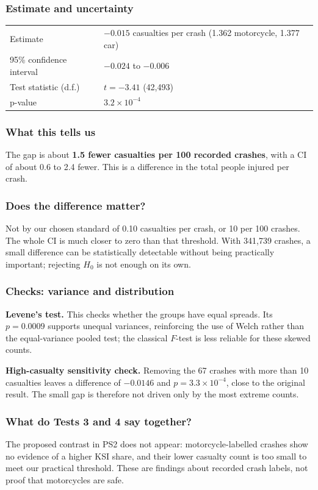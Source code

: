 \documentclass[10pt,a4paper,twocolumn]{article}
\begin{document}
\subsubsection*{Estimate and uncertainty}
{\small
\begin{tabularx}{\linewidth}{@{}K{3.4cm} Y@{}}
\toprule
Estimate & $-0.015$ casualties per crash (1.362 motorcycle, 1.377 car) \\
95\% confidence interval & $-0.024$ to $-0.006$ \\
Test statistic (d.f.) & $t=-3.41$ (42{,}493) \\
p-value & $3.2\times10^{-4}$ \\
\bottomrule
\end{tabularx}}

\subsubsection*{What this tells us}
The gap is about \textbf{1.5 fewer casualties per 100 recorded crashes}, with a CI of about
0.6 to 2.4 fewer. This is a difference in the total people injured per crash.

\subsubsection*{Does the difference matter?}
Not by our chosen standard of 0.10 casualties per crash, or 10 per 100 crashes.
The whole CI is much closer to zero than that threshold.
With 341{,}739 crashes, a small difference can be statistically detectable without being
practically important; rejecting $H_0$ is not enough on its own.

\subsubsection*{Checks: variance and distribution}
\textbf{Levene's test.} This checks whether the groups have equal spreads.
Its $p=0.0009$ supports unequal variances, reinforcing the use of Welch rather than the
equal-variance pooled test; the classical $F$-test is less reliable for these skewed counts.

\textbf{High-casualty sensitivity check.} Removing the 67 crashes with more than 10 casualties
leaves a difference of $-0.0146$ and $p=3.3\times10^{-4}$, close to the original result.
The small gap is therefore not driven only by the most extreme counts.

\subsubsection*{What do Tests 3 and 4 say together?}
The proposed contrast in PS2 does not appear: motorcycle-labelled crashes show no evidence
of a higher KSI share, and their lower casualty count is too small to meet our practical
threshold. These are findings about recorded crash labels, not proof that motorcycles are safe.
\end{document}
